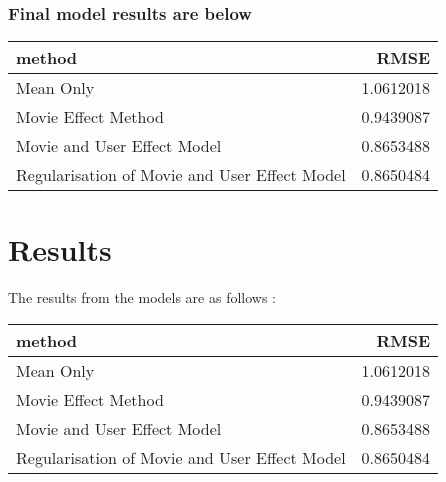 \documentclass[
]{article}
\newenvironment{Shaded}{\begin{snugshade}}{\end{snugshade}}
\newcommand{\DataTypeTok}[1]{\textcolor[rgb]{0.13,0.29,0.53}{#1}}
\newcommand{\KeywordTok}[1]{\textcolor[rgb]{0.13,0.29,0.53}{\textbf{#1}}}
\newcommand{\NormalTok}[1]{#1}
\newcommand{\OperatorTok}[1]{\textcolor[rgb]{0.81,0.36,0.00}{\textbf{#1}}}
\newcommand{\StringTok}[1]{\textcolor[rgb]{0.31,0.60,0.02}{#1}}
\begin{document}
\hypertarget{final-model-results-are-below}{%
\subsubsection{Final model results are
below}\label{final-model-results-are-below}}

\begin{Shaded}
\end{Shaded}

\begin{longtable}[]{@{}lr@{}}
\toprule
method & RMSE\tabularnewline
\midrule
\endhead
Mean Only & 1.0612018\tabularnewline
Movie Effect Method & 0.9439087\tabularnewline
Movie and User Effect Model & 0.8653488\tabularnewline
Regularisation of Movie and User Effect Model & 0.8650484\tabularnewline
\bottomrule
\end{longtable}

\hypertarget{results}{%
\section{Results}\label{results}}

The results from the models are as follows :

\begin{Shaded}
\end{Shaded}

\begin{longtable}[]{@{}lr@{}}
\toprule
method & RMSE\tabularnewline
\midrule
\endhead
Mean Only & 1.0612018\tabularnewline
Movie Effect Method & 0.9439087\tabularnewline
Movie and User Effect Model & 0.8653488\tabularnewline
Regularisation of Movie and User Effect Model & 0.8650484\tabularnewline
\bottomrule
\end{longtable}
\end{document}
